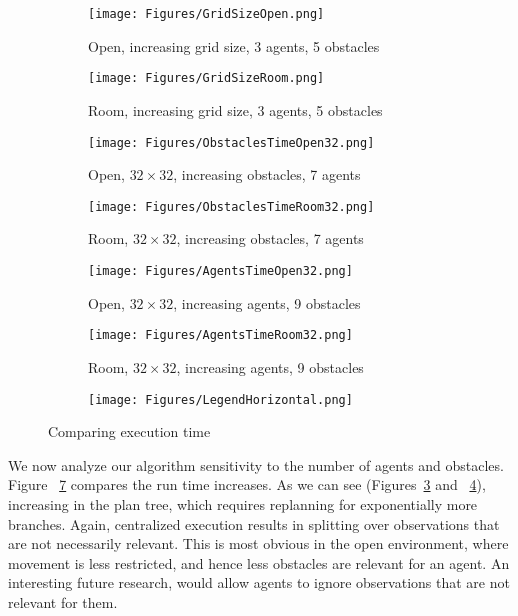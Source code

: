 \documentclass[letterpaper]{article} %
\begin{document}
\begin{figure}[t]
    \centering
    \begin{subfigure}[b]{0.2\textwidth}
      \texttt{[image: Figures/GridSizeOpen.png]}
      \caption{Open, increasing grid size, 3 agents, 5 obstacles}
      \label{fig:GridSizeOpen}
    \end{subfigure}
    \begin{subfigure}[b]{0.2\textwidth}
      \texttt{[image: Figures/GridSizeRoom.png]}
      \caption{Room, increasing grid size, 3 agents, 5 obstacles}
      \label{fig:GridSizeRoom}
    \end{subfigure}
    \begin{subfigure}[b]{0.2\textwidth}
      \texttt{[image: Figures/ObstaclesTimeOpen32.png]}
      \caption{Open, $32\times 32$, increasing obstacles, 7 agents}
      \label{fig:ObstaclesOpen}
    \end{subfigure}
    \begin{subfigure}[b]{0.2\textwidth}
      \texttt{[image: Figures/ObstaclesTimeRoom32.png]}
      \caption{Room, $32\times 32$, increasing obstacles, 7 agents}
      \label{fig:ObstaclesRoom}
    \end{subfigure}
    \begin{subfigure}[b]{0.2\textwidth}
      \texttt{[image: Figures/AgentsTimeOpen32.png]}
      \caption{Open, $32\times 32$, increasing agents, 9 obstacles}
      \label{fig:AgentsOpen}
    \end{subfigure}
    \begin{subfigure}[b]{0.2\textwidth}
      \texttt{[image: Figures/AgentsTimeRoom32.png]}
      \caption{Room, $32\times 32$, increasing agents, 9 obstacles}
      \label{fig:AgentsRoom}
    \end{subfigure}
        \begin{subfigure}[b]{0.24\textwidth}
      \texttt{[image: Figures/LegendHorizontal.png]}
    \end{subfigure}
    \caption{Comparing execution time}
    \label{fig:32}
\end{figure}
We now analyze our algorithm sensitivity to the number of agents and obstacles.
Figure ~\ref{fig:32} compares the run time  increases. As we can see (Figures~\ref{fig:ObstaclesOpen} and ~\ref{fig:ObstaclesRoom}), increasing   in the plan tree, which requires replanning for exponentially more branches. Again, centralized execution results in splitting over observations that are not necessarily relevant. This is most obvious in the open environment, where movement is less restricted, and hence less obstacles are relevant for an agent.  An interesting future research, would allow agents to ignore observations that are not relevant for them.
\end{document}
